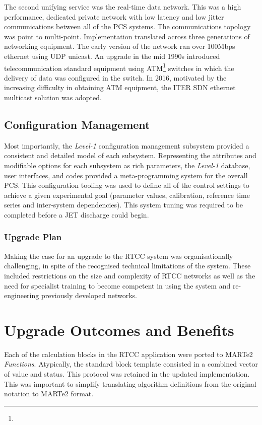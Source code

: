 \documentclass[preprint,12pt]{elsarticle}
\begin{document}
The second unifying service was the real-time data network. This was a high performance, dedicated private network with low latency and low jitter communications between all of the PCS systems.  The communications topology was point to multi-point. Implementation translated across three generations of networking equipment.  The early version of the network ran over 100Mbps ethernet using UDP unicast. An upgrade in the mid 1990s introduced telecommunication standard equipment using ATM\footnote{} switches in which the delivery of data was configured in the switch. In 2016, motivated by the increasing difficulty in obtaining ATM equipment, the ITER SDN ethernet multicast solution was adopted.

\subsection{Configuration Management}

  Most importantly, the {\em Level-1} configuration management subsystem provided a consistent and detailed model of each subsystem. Representing the attributes and modifiable options for each subsystem as rich parameters, the {\em Level-1} database, user interfaces, and codes provided a meta-programming system for the overall PCS.  This configuration tooling was
used to define all of the control settings to achieve a given experimental goal (parameter values, calibration, reference time series and inter-system dependencies).  This system tuning was required to be completed before a JET discharge could begin.  

\subsubsection{Upgrade Plan}

Making the case for an upgrade to the RTCC system was organisationally
challenging, in spite of the recognised technical limitations of the system.
These included restrictions on the size and complexity of RTCC networks
as well as the need for specialist training to become competent in
using the system and re-engineering previously developed networks.



\section{Upgrade Outcomes and Benefits}

Each of the calculation blocks in the RTCC application were ported to MARTe2 {\em Functions}.
Atypically, the standard block template consisted in a combined vector of value and status.
This protocol was retained in the updated implementation. This was important to simplify
translating algorithm definitions from the original notation to MARTe2 format.
\end{document}

